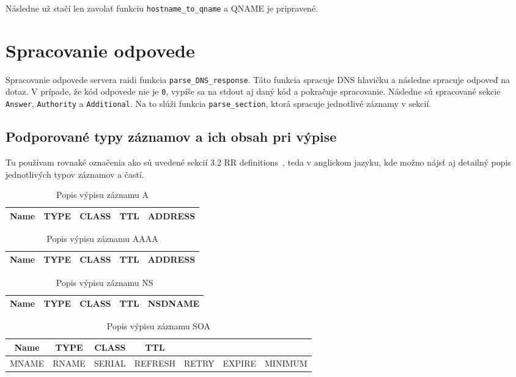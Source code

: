 \noindent Následne už stačí len zavolať funkciu \texttt{hostname\_to\_qname} a QNAME je pripravené.


\section{Spracovanie odpovede}
Spracovanie odpovede servera raidi funkcia \texttt{parse\_DNS\_response}. Táto funkcia spracuje DNS hlavičku a následne spracuje odpoveď na dotaz. V prípade, že kód odpovede nie je \texttt{0}, vypíše sa na stdout aj daný kód a pokračuje spracovanie. Následne sú spracované sekcie \texttt{Answer}, \texttt{Authority} a \texttt{Additional}. Na to slúži funkcia \texttt{parse\_section}, ktorá spracuje jednotlivé záznamy v sekcií.

\subsection{Podporované typy záznamov a ich obsah pri výpise}
Tu používam rovnaké označenia ako sú uvedené sekcií 3.2 RR definitions~\cite{RFC1035}, teda v anglickom jazyku, kde možno nájsť aj detailný popis jednotlivých typov záznamov a častí.
\begin{table}[!ht]
    \centering
    \begin{tabular}{|c|c|c|c|c|}
        \hline
        Name & TYPE & CLASS & TTL & ADDRESS \\
        \hline
    \end{tabular}
    \caption{Popis výpisu záznamu A}
\end{table}

\begin{table}[!ht]
    \centering
    \begin{tabular}{|c|c|c|c|c|}
        \hline
        Name & TYPE & CLASS & TTL & ADDRESS \\
        \hline
    \end{tabular}
    \caption{Popis výpisu záznamu AAAA}
\end{table}

\begin{table}[!ht]
    \centering
    \begin{tabular}{|c|c|c|c|c|}
        \hline
        Name & TYPE & CLASS & TTL & NSDNAME \\
        \hline
    \end{tabular}
    \caption{Popis výpisu záznamu NS}
\end{table}

\begin{table}[!ht]
    \centering
    \begin{tabular}{|c|c|c|c|c|c|c|}
        \hline
        Name & TYPE & CLASS & TTL &&&\\
        \hline
        MNAME & RNAME & SERIAL & REFRESH & RETRY & EXPIRE & MINIMUM\\
        \hline
    \end{tabular}
    \caption{Popis výpisu záznamu SOA}
\end{table}


